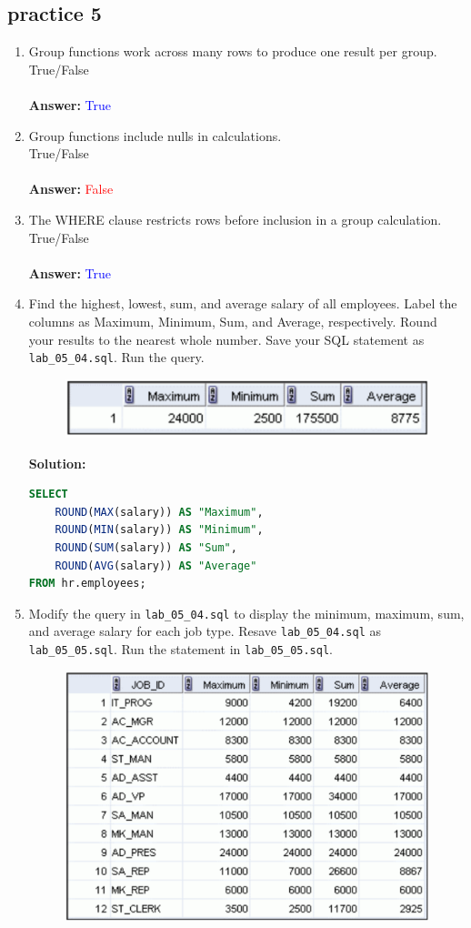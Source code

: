\documentclass[a4paper,12pt]{article}
\begin{document}
\subsection*{practice 5}
\begin{enumerate}
    \item Group functions work across many rows to produce one result per group.\\
True/False\\\\
    \textbf{Answer: }\textcolor{blue}{True}
    \item Group functions include nulls in calculations. \\
True/False\\\\
    \textbf{Answer: }\textcolor{red}{False}
    \item The WHERE clause restricts rows before inclusion in a group calculation.\\
True/False\\\\
    \textbf{Answer: }\textcolor{blue}{True}

    \item     Find the highest, lowest, sum, and average salary of all employees. Label the columns
as Maximum, Minimum, Sum, and Average, respectively. Round your results to the nearest
whole number. Save your SQL statement as \texttt{lab\_05\_04.sql}. Run the query.
    \begin{figure}[h]
        \centering
        \includegraphics[width=.5\linewidth]{graphics/64.png}
    \end{figure}

    \textbf{Solution: }
    \begin{lstlisting}[language=SQL]
SELECT
    ROUND(MAX(salary)) AS "Maximum",
    ROUND(MIN(salary)) AS "Minimum",
    ROUND(SUM(salary)) AS "Sum",
    ROUND(AVG(salary)) AS "Average"
FROM hr.employees;
    \end{lstlisting}
        \item Modify the query in \texttt{lab\_05\_04.sql} to display the minimum, maximum, sum, and average
salary for each job type. Resave \texttt{lab\_05\_04.sql} as \texttt{lab\_05\_05.sql}. Run the statement
in \texttt{lab\_05\_05.sql}.
    \begin{figure}[h]
        \centering
        \includegraphics[width=.5\linewidth]{graphics/65.png}
    \end{figure}


\end{enumerate}
\end{document}

